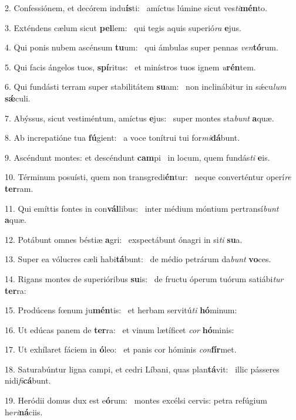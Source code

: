 2. Confessiónem, et decórem indu\textbf{ís}ti: \ast\  amíctus lúmine sicut ves\textit{ti}\textbf{mén}to.\

3. Exténdens cælum sicut \textbf{pel}lem: \ast\  qui tegis aquis superió\textit{ra} \textbf{e}jus.\

4. Qui ponis nubem ascénsum \textbf{tu}um: \ast\  qui ámbulas super pennas \textit{ven}\textbf{tó}rum.\

5. Qui facis ángelos tuos, \textbf{spí}ritus: \ast\  et minístros tuos ignem \textit{u}\textbf{rén}tem.\

6. Qui fundásti terram super stabilitátem \textbf{su}am: \ast\  non inclinábitur in sǽcu\textit{lum} \textbf{sǽ}culi.\

7. Abýssus, sicut vestiméntum, amíctus \textbf{e}jus: \ast\  super montes sta\textit{bunt} \textbf{a}quæ.\

8. Ab increpatióne tua \textbf{fú}gient: \ast\  a voce tonítrui tui for\textit{mi}\textbf{dá}bunt.\

9. Ascéndunt montes: et descéndunt \textbf{cam}pi \ast\  in locum, quem fundás\textit{ti} \textbf{e}is.\

10. Términum posuísti, quem non transgredi\textbf{én}tur: \ast\  neque converténtur operí\textit{re} \textbf{ter}ram.\

11. Qui emíttis fontes in con\textbf{vál}libus: \ast\  inter médium móntium pertransí\textit{bunt} \textbf{a}quæ.\

12. Potábunt omnes béstiæ \textbf{a}gri: \ast\  exspectábunt ónagri in si\textit{ti} \textbf{su}a.\

13. Super ea vólucres cæli habi\textbf{tá}bunt: \ast\  de médio petrárum da\textit{bunt} \textbf{vo}ces.\

14. Rigans montes de superióribus \textbf{su}is: \ast\  de fructu óperum tuórum satiábi\textit{tur} \textbf{ter}ra:\

15. Prodúcens fœnum ju\textbf{mén}tis: \ast\  et herbam servitú\textit{ti} \textbf{hó}minum:\

16. Ut edúcas panem de \textbf{ter}ra: \ast\  et vinum lætíficet \textit{cor} \textbf{hó}minis:\

17. Ut exhílaret fáciem in \textbf{ó}leo: \ast\  et panis cor hóminis \textit{con}\textbf{fír}met.\

18. Saturabúntur ligna campi, et cedri Líbani, quas plan\textbf{tá}vit: \ast\  illic pásseres nidi\textit{fi}\textbf{cá}bunt.\

19. Heródii domus dux est e\textbf{ó}rum: \ast\  montes excélsi cervis: petra refúgium he\textit{ri}\textbf{ná}ciis.\

